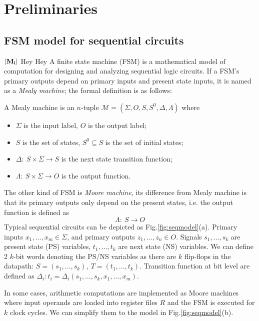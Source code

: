 %


\section{Preliminaries}

\subsection{FSM model for sequential circuits}
${|\bf M_i|}$ Hey Hey
A finite state machine (FSM) is a mathematical model of computation for designing and analyzing sequential logic 
circuits. If a FSM's primary outputs depend on primary inputs and present state inputs, it is named as a \textit{Mealy machine};
the formal definition is as follows:
\begin{Definition}
A Mealy machine is an $n$-tuple $\mathcal M = (\Sigma,O,S,S^0,\Delta,\Lambda)$ where
\begin{itemize}
\item $\Sigma$ is the input label, $O$ is the output label;
\item $S$ is the set of states, $S^0\subseteq S$ is the set of initial states;
\item $\Delta:\ S\times\Sigma\to S$ is the next state transition function;
\item $\Lambda:\ S\times\Sigma\to O$ is the output function.
\end{itemize}
\end{Definition}
The other kind of FSM is \textit{Moore machine}, its difference from Mealy machine is that
its primary outputs only depend on the present states, i.e. the output function is defined as
$$\Lambda:\ S \to O$$
Typical sequential circuits can be depicted as Fig.\ref{fig:seqmodel}(a). Primary inputs
$x_1,\dots,x_m \in \Sigma$, and primary outputs $z_1,\dots,z_n\in O$. Signals $s_1,\dots,s_k$ 
are present state (PS) variables, $t_1,\dots,t_k$ are next state (NS) variables.
We can define 2 $k$-bit words denoting the PS/NS variables as there are $k$ flip-flops
in the datapath: $S = (s_1,\dots,s_k), ~T=(t_1,\dots,t_k)$. Transition function
at bit level are defined as $\Delta_i: t_i = \Delta_i(s_1,\dots,s_k,x_1,\dots,x_m)$.
\begin{figure}[hbt]
\end{figure}
In some cases, arithmetic computations are implemented as Moore machines where input operands
are loaded into register files $R$ and the FSM is executed for $k$ clock cycles.
We can simplify them to the model in Fig.\ref{fig:seqmodel}(b).

